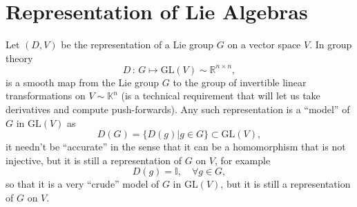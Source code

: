 \section{Representation of Lie Algebras}

\begin{definition}
    Let \((D,V)\) be the representation of a Lie group \(G\) on a vector space \(V\). In group theory
    \[
        D \,:\, G \mapsto \mathrm{GL}(V)\sim \mathbb{R}^{n \times n},
    \]
    is a smooth map from the Lie group \(G\) to the group of invertible linear transformations on \(V \sim \mathbb{K}^n\) (is a technical requirement that will let us take derivatives and compute push-forwards). Any such representation is a ``model'' of \(G\) in \(\mathrm{GL}(V)\) as
    \[
        D(G) = \{ D(g) | g \in G\} \subset \mathrm{GL}(V),
    \]
    it needn't be ``accurate'' in the sense that it can be a homomorphism that is not injective, but it is still a representation of \(G\) on \(V\), for example
    \[
        D(g) = \mathbb{I}, \quad \forall g \in G,
    \]
    so that it is a very ``crude'' model of \(G\) in \(\mathrm{GL}(V)\), but it is still a representation of \(G\) on \(V\).
\end{definition}

